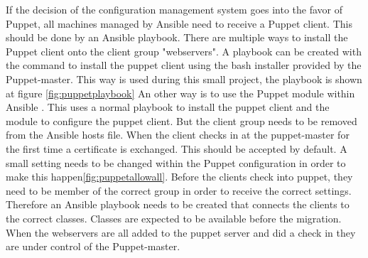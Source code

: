 



If the decision of the configuration management system goes into the favor of Puppet, all machines managed by Ansible need to receive a Puppet client. This should be done by an Ansible playbook. There are multiple ways to install the Puppet client onto the client group "webservers". A playbook can be created with the command to install the puppet client using the bash installer provided by the Puppet-master. This way is used during this small project, the playbook is shown at figure \ref{fig:puppetplaybook} An other way is to use the Puppet module within Ansible \cite{ansiblepuppet}. This uses a normal playbook to install the puppet client and the module to configure the puppet client. But the client group needs to be removed from the Ansible hosts file. When the client checks in at the puppet-master for the first time a certificate is exchanged. This should be accepted by default. A small setting needs to be changed within the Puppet configuration in order to make this happen\ref{fig:puppetallowall}. Before the clients check into puppet, they need to be member of the correct group in order to receive the correct settings. Therefore an Ansible playbook needs to be created that connects the clients to the correct classes. Classes are expected to be available before the migration. When the webservers are all added to the puppet server and did a check in they are under control of the Puppet-master.



